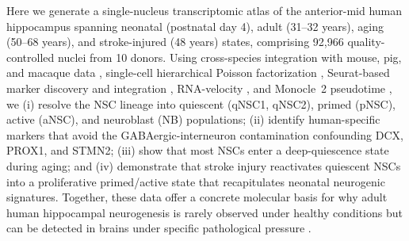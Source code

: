 Here we generate a single-nucleus transcriptomic atlas of the anterior-mid human hippocampus spanning neonatal (postnatal day 4), adult (31--32 years), aging (50--68 years), and stroke-injured (48 years) states, comprising 92{,}966 quality-controlled nuclei from 10 donors. Using cross-species integration with mouse, pig, and macaque data \cite{hochgerner2018conserved,franjic2022transcriptomic}, single-cell hierarchical Poisson factorization \cite{levitin2019gene}, Seurat-based marker discovery and integration \cite{butler2018integrating}, RNA-velocity \cite{lamanno2018rna}, and Monocle~2 pseudotime \cite{trapnell2014dynamics}, we (i) resolve the NSC lineage into quiescent (qNSC1, qNSC2), primed (pNSC), active (aNSC), and neuroblast (NB) populations; (ii) identify human-specific markers that avoid the GABAergic-interneuron contamination confounding DCX, PROX1, and STMN2; (iii) show that most NSCs enter a deep-quiescence state during aging; and (iv) demonstrate that stroke injury reactivates quiescent NSCs into a proliferative primed/active state that recapitulates neonatal neurogenic signatures. Together, these data offer a concrete molecular basis for why adult human hippocampal neurogenesis is rarely observed under healthy conditions but can be detected in brains under specific pathological pressure \cite{morenojimenez2019adult,terrerosroncal2021impact}.

